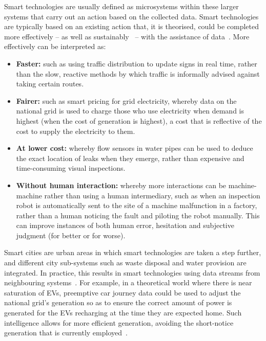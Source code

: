 \documentclass[conference]{IEEEtran}
\begin{document}
Smart technologies are usually defined as microsystems within these
larger systems that carry out an action based on the collected
data. Smart technologies are typically based on an existing action
that, it is theorised, could be completed more effectively -- as well
as sustainably~\cite{cosgrave-et-al:2014} -- with the assistance of
data~\cite{arup-et-al:2011}. More effectively can be interpreted as:

\begin{itemize}
\item {\textbf{Faster:}} such as using traffic distribution to update
  signs in real time, rather than the slow, reactive methods
  by which traffic is informally advised against taking certain
  routes.
\item {\textbf{Fairer:}} such as smart pricing for grid electricity,
  whereby data on the national grid is used to charge those who
  use electricity when demand is highest (when the cost of generation
  is highest), a cost that is reflective of the cost to supply the
  electricity to them. 
\item {\textbf{At lower cost:}} whereby flow sensors in water pipes
  can be used to deduce the exact location of leaks when they emerge,
  rather than expensive and time-consuming visual inspections.
\item {\textbf{Without human interaction:}} whereby more interactions
  can be machine-machine rather than using a human intermediary, such
  as when an inspection robot is automatically sent to the site of a
  machine malfunction in a factory, rather than a human noticing the
  fault and piloting the robot manually. This can improve instances of
  both human error, hesitation and subjective judgment (for better or
  for worse). 
\end{itemize}

Smart cities are urban areas in which smart technologies are taken a
step further, and different city sub-systems such as waste disposal
and water provision are integrated. In practice, this results in smart
technologies using data streams from neighbouring
systems~\cite{shapiro:2006}. For example, in a theoretical world where
there is near saturation of EVs, preemptive car journey data could be
used to adjust the national grid's generation so as to ensure the
correct amount of power is generated for the EVs recharging at the
time they are expected home. Such intelligence allows for more
efficient generation, avoiding the short-notice generation that is
currently employed~\cite{tsoukalas:2008}.
\end{document}
